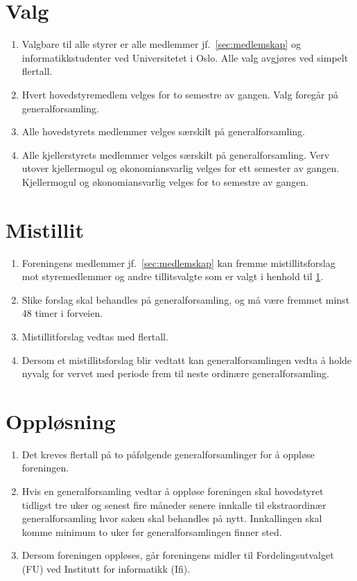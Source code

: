 \documentclass[8pt,norsk,a4paper]{article}
\begin{document}
\section{Valg}\label{sec:valg}
\begin{enumerate}
	\item{Valgbare til alle styrer er alle medlemmer jf.~\ref{sec:medlemskap} og informatikkstudenter ved Universitetet i Oslo. Alle valg avgjøres ved simpelt flertall.}
	\item{Hvert hovedstyremedlem velges for to semestre av gangen. Valg foregår på generalforsamling.}
	\item{Alle hovedstyrets medlemmer velges særskilt på generalforsamling.}
	\item{Alle kjellerstyrets medlemmer velges særskilt på generalforsamling. Verv utover kjellermogul og økonomiansvarlig velges for ett semester av gangen. Kjellermogul og økonomiansvarlig velges for to semestre av gangen. }
\end{enumerate}

\section{Mistillit}\label{sec:mistillit}
\begin{enumerate}
	\item{Foreningens medlemmer jf.~\ref{sec:medlemskap} kan fremme mistillitsforslag mot styremedlemmer og andre tillitsvalgte som er valgt i henhold til \ref{sec:valg}.}
	\item{Slike forslag skal behandles på generalforsamling, og må være fremmet minst 48 timer i forveien.}
	\item{Mistillitforslag vedtas med  flertall.}
	\item{Dersom et mistillitsforslag blir vedtatt kan generalforsamlingen vedta å holde nyvalg for vervet med periode frem til neste ordinære generalforsamling.}
\end{enumerate}

\section{Oppløsning}\label{sec:opplosning}
\begin{enumerate}
        \item{Det kreves  flertall på to påfølgende generalforsamlinger for å oppløse foreningen.}
        \item{Hvis en generalforsamling vedtar å oppløse foreningen skal hovedstyret tidligst tre uker og senest fire måneder senere innkalle til ekstraordinær generalforsamling hvor saken skal behandles på nytt. Innkallingen skal komme minimum to uker før generalforsamlingen finner sted.}
        \item{Dersom foreningen oppløses, går foreningens midler til Fordelingsutvalget (FU) ved Institutt for informatikk (Ifi).}
\end{enumerate}
\end{document}

